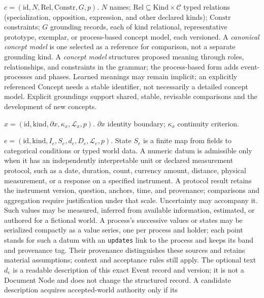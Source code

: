 \documentclass[11pt,a4paper]{article}
\newcommand{\Cset}{\mathcal C}
\newcommand{\Lset}{\mathcal L}
\begin{document}
\begin{description}[style=nextline]
  \item[Concept] $c=(\mathrm{id},N,\mathrm{Rel},\mathrm{Constr},G,p)$.
    $N$ names; $\mathrm{Rel}\subseteq \mathrm{Kind}\times\Cset$ typed
    relations (specialization, opposition, expression, and other declared
    kinds); $\mathrm{Constr}$ constraints; $G$ grounding records, each of
    kind relational, representative prototype, exemplar, or process-based
    concept model, each versioned. A \emph{canonical concept model} is one
    selected as a reference for comparison, not a separate grounding kind.
    A \emph{concept model} structures proposed meaning through roles,
    relationships, and constraints in the grammar; the process-based form
    adds event-processes and phases. Learned meanings may remain implicit;
    an explicitly referenced Concept needs a stable identifier, not necessarily
    a detailed concept model. Explicit groundings support shared, stable,
    revisable comparisons and the development of new concepts.
  \item[Thing] $x=(\mathrm{id},\mathrm{kind},\partial x,\kappa_x,\Lset_x,p)$.
    $\partial x$ identity boundary; $\kappa_x$ continuity criterion.
  \item[Event] $e=(\mathrm{id},\mathrm{kind},I_e,S_e,d_e,D_e,\Lset_e,p)$.
    State $S_e$ is a finite map from fields to categorical
    conditions or typed world data. A numeric datum is admissible only when it
    has an independently interpretable unit or declared measurement protocol,
    such as a date, duration, count, currency amount, distance, physical
    measurement, or a response on a specified instrument. A protocol result
    retains the instrument version, question, anchors, time, and provenance;
    comparisons and aggregation require justification under that scale.
    Uncertainty may accompany it. Such values may be measured, inferred from
    available information, estimated, or authored for a fictional world. A
    process's successive values or states may be serialized compactly as a
    value series, one per process and holder; each point stands for such a
    datum with an \texttt{updates} link to the process and keeps its band and
    provenance tag. Their provenance
    distinguishes these sources and retains material assumptions; context and
    acceptance rules still apply. The optional text $d_e$ is a
    readable description of this exact Event record and version;
    it is not a Document Node and does not change the structured record.
    A candidate description acquires accepted-world authority only if its

\end{description}
\end{document}
